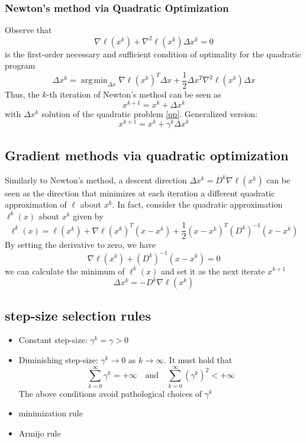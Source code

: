 \documentclass{book}
\DeclareMathOperator*{\argmin}{arg\,min}
\begin{document}
\subsubsection{Newton's method via Quadratic Optimization}
Observe that 
\[
    \nabla\ell(x^k) +\nabla^2\ell(x^k)\Delta x^k = 0
\]
is the first-order necessary and sufficient condition of optimality for the quadratic program 
\begin{equation}
    \label{qp}
    \Delta x^k = \argmin_{\Delta x}\nabla\ell(x^k)^T \Delta x+\displaystyle\frac{1}{2}\Delta x^T\nabla^2\ell(x^k)\Delta x
\end{equation}
Thus, the $k$-th iteration of Newton's method can be seen as 
\[
    x^{k+1} = x^k+\Delta x^k
\]
with $\Delta x^k$ solution of the quadratic problem \ref{qp}. Generalized version: 
\[
    x^{k+1} = x^k + \gamma^k \Delta x^k
\]

\subsection{Gradient methods via quadratic optimization}
Similarly to Newton's method, a descent direction $\Delta x^k=D^k\nabla\ell(x^k)$ can be seen as the direction that minimizes at each iteration a different quadratic approximation of $\ell$ about $x^k$. In fact, consider the quadratic approximation $\ell^k(x)$ about $x^k$ given by 
\[
    \ell^k(x) = \ell(x^k)+\nabla\ell(x^k)^T(x-x^k)+\displaystyle\frac{1}{2}(x-x^k)^T(D^k)^{-1}(x-x^k)
\]
By setting the derivative to zero, we have 
\[
    \nabla\ell(x^k)+(D^k)^{-1}(x-x^k)=0
\]
we can calculate the minimum of $\ell^k(x)$ and set it as the next iterate $x^{k+1}$
\[
    \Delta x^k = -D^k\nabla\ell(x^k)
\]
\subsection{step-size selection rules}
\begin{itemize}
    \item Constant step-size: $\gamma^k=\gamma>0$
        \item Diminishing step-size: $\gamma^k\to 0$ as $k\to\infty$. It must hold that \[
                \displaystyle\sum_{k=0}^{\infty}\gamma^k = +\infty \quad \text{and} \quad \displaystyle\sum_{k=0}^{\infty}(\gamma^k)^2 < +\infty
        \]
        The above conditions avoid pathological choices of $\gamma^k$
        \item minimization rule
        \item Armijo rule
\end{itemize}
\end{document}
